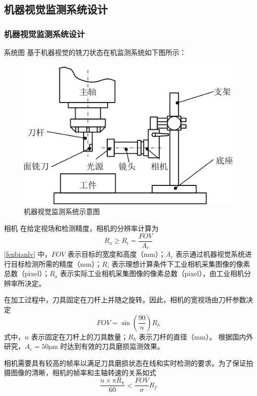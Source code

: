 \documentclass[aspectratio=169,t,xcolor=table,10pt]{ctexbeamer}
\numberwithin{equation}{section} %
\begin{document}
	\subsection{机器视觉监测系统设计}
	\begin{frame}
		\frametitle{机器视觉监测系统设计}
		\begin{block}{系统图}
			\qquad 基于机器视觉的铣刀状态在机监测系统如下图所示：
			\begin{figure}[H]
				\centering
				\includegraphics[width=0.5\linewidth]{Figure/System}
				\caption{机器视觉监测系统示意图}
			\end{figure}
		\end{block}
	\end{frame}

	\begin{frame}[squeeze]
		\begin{block}{相机}
			\qquad 在给定视场和检测精度，相机的分辨率计算为
			\begin{equation}
				R_a\ge R_i = \frac{FOV}{A_c}
				\label{fenbianlv}
			\end{equation}
			\eqref{fenbianlv} 中，$FOV$ 表示目标的宽度和高度（$\mathrm{mm}$）；$A_c$ 表示通过机器视觉系统进行目标检测所需的精度（$\mathrm{mm}$）；$R_i$ 表示理想计算条件下工业相机采集图像的像素总数（pixel）；$R_a$ 表示实际工业相机采集图像的像素总数（pixel），由工业相机分辨率所决定。
			
			\qquad 在加工过程中，刀具固定在刀杆上并随之旋转。因此，相机的宽视场由刀杆参数决定
			\begin{equation}
				FOV = \sin(\frac{90}{n})R_h
				\label{FOV}
			\end{equation}
			式中，$n$ 表示固定在刀杆上的刀具数量；$R_h$ 表示刀杆的直径（$\mathrm{mm}$）。 根据国内外研究，$A_c=50\mathrm{\mu m}$ 时达到有效的刀具磨损监测效果。
			
			\qquad 相机需要具有较高的帧率以满足刀具磨损状态在线和实时检测的要求。为了保证拍摄图像的清晰，相机的帧率和主轴转速的关系如式
			\begin{equation}
				\frac{n\times\pi R_h}{60}<\frac{FOV}{\sigma}R_f
				\label{zhenlv}
			\end{equation}
		\end{block}
	\end{frame}
	
\end{document}
